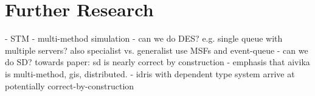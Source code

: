\section{Further Research}
- STM
- multi-method simulation
	- can we do DES? e.g. single queue with multiple servers? also specialist vs. generalist use MSFs and event-queue
	- can we do SD? towards paper: sd is nearly correct by construction
	- emphasis that aivika is multi-method, gis, distributed. 
- idris with dependent type system arrive at potentially correct-by-construction